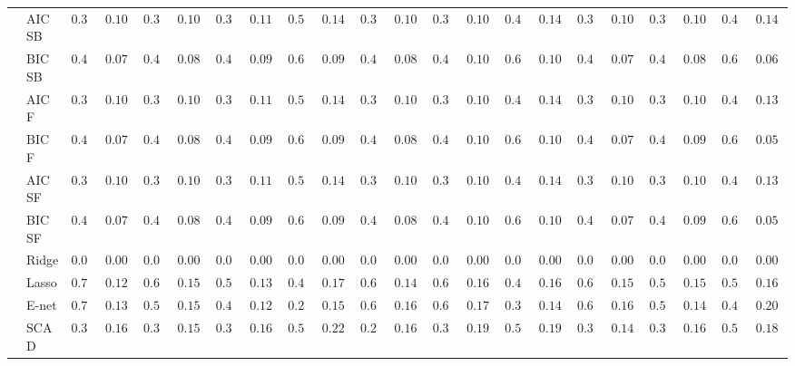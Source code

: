 \begin{tabular}{ll|ll|llllll|llllll|llllll}
 & AIC SB  & $0.338$ & $0.1013$ & $0.326$ & $0.1050$ & $0.354$ & $0.1132$ & $0.504$ & $0.1435$ & $0.324$ & $0.1093$ & $0.338$ & $0.1052$ & $0.438$ & $0.1469$ & $0.328$ & $0.1083$ & $0.350$ & $0.1040$ & $0.458$ & $0.1485$ \\
 & BIC SB  & $0.430$ & $0.0718$ & $0.436$ & $0.0823$ & $0.468$ & $0.0952$ & $0.652$ & $0.0926$ & $0.448$ & $0.0858$ & $0.454$ & $0.1058$ & $0.600$ & $0.1025$ & $0.422$ & $0.0799$ & $0.452$ & $0.0882$ & $0.606$ & $0.0600$ \\
 & AIC F  & $0.338$ & $0.1013$ & $0.328$ & $0.1045$ & $0.356$ & $0.1122$ & $0.520$ & $0.1421$ & $0.326$ & $0.1088$ & $0.344$ & $0.1028$ & $0.484$ & $0.1454$ & $0.330$ & $0.1078$ & $0.354$ & $0.1058$ & $0.492$ & $0.1316$ \\
 & BIC F  & $0.430$ & $0.0718$ & $0.436$ & $0.0823$ & $0.470$ & $0.0959$ & $0.656$ & $0.0903$ & $0.448$ & $0.0858$ & $0.458$ & $0.1037$ & $0.612$ & $0.1094$ & $0.422$ & $0.0799$ & $0.456$ & $0.0903$ & $0.608$ & $0.0563$ \\
 & AIC SF  & $0.338$ & $0.1013$ & $0.328$ & $0.1045$ & $0.356$ & $0.1122$ & $0.520$ & $0.1421$ & $0.326$ & $0.1088$ & $0.344$ & $0.1028$ & $0.486$ & $0.1484$ & $0.330$ & $0.1078$ & $0.354$ & $0.1058$ & $0.492$ & $0.1316$ \\
 & BIC SF  & $0.430$ & $0.0718$ & $0.436$ & $0.0823$ & $0.470$ & $0.0959$ & $0.656$ & $0.0903$ & $0.448$ & $0.0858$ & $0.458$ & $0.1037$ & $0.612$ & $0.1094$ & $0.422$ & $0.0799$ & $0.456$ & $0.0903$ & $0.608$ & $0.0563$ \\
 & Ridge  & $0.000$ & $0.0000$ & $0.000$ & $0.0000$ & $0.000$ & $0.0000$ & $0.000$ & $0.0000$ & $0.000$ & $0.0000$ & $0.000$ & $0.0000$ & $0.000$ & $0.0000$ & $0.000$ & $0.0000$ & $0.000$ & $0.0000$ & $0.000$ & $0.0000$ \\
 & Lasso  & $0.724$ & $0.1232$ & $0.624$ & $0.1564$ & $0.528$ & $0.1349$ & $0.490$ & $0.1738$ & $0.698$ & $0.1407$ & $0.658$ & $0.1615$ & $0.490$ & $0.1691$ & $0.670$ & $0.1592$ & $0.596$ & $0.1530$ & $0.560$ & $0.1633$ \\
 & E-net  & $0.706$ & $0.1317$ & $0.592$ & $0.1555$ & $0.466$ & $0.1241$ & $0.296$ & $0.1595$ & $0.672$ & $0.1621$ & $0.608$ & $0.1727$ & $0.398$ & $0.1491$ & $0.654$ & $0.1604$ & $0.580$ & $0.1491$ & $0.466$ & $0.2071$ \\
 & SCAD  & $0.306$ & $0.1669$ & $0.306$ & $0.1594$ & $0.326$ & $0.1697$ & $0.558$ & $0.2226$ & $0.248$ & $0.1685$ & $0.312$ & $0.1914$ & $0.502$ & $0.1938$ & $0.302$ & $0.1463$ & $0.322$ & $0.1679$ & $0.502$ & $0.1809$ \\

\end{tabular}
